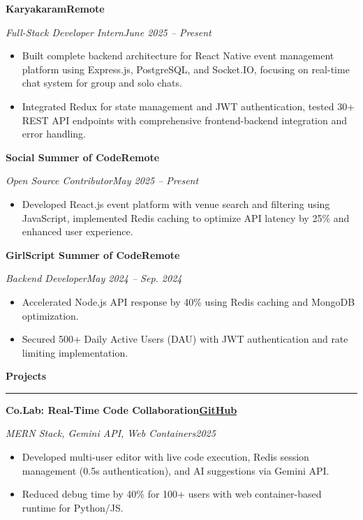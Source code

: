 \documentclass{article}
\newcommand{\sectionheader}[1]{%
  \vspace{1.5ex}\noindent\textbf{\Large #1}%
  \par\rule{\textwidth}{0.8pt}\vspace{0.5ex}%
}
\newcommand{\subheading}[4]{%
  \vspace{0.5ex}\noindent\textbf{#1}\hfill\textbf{#2}\par%
  \noindent\textit{#3}\hfill\textit{#4}\par\vspace{-0.5ex}%
}
\begin{document}
\subheading{Karyakaram}{Remote}
            {Full-Stack Developer Intern}{June 2025 – Present}
\begin{itemize}[leftmargin=*,noitemsep,topsep=0pt,parsep=0pt,partopsep=0pt]
    \item Built complete backend architecture for React Native event management platform using Express.js, PostgreSQL, and Socket.IO, focusing on real-time chat system for group and solo chats.
    \item Integrated Redux for state management and JWT authentication, tested 30+ REST API endpoints with comprehensive frontend-backend integration and error handling.
\end{itemize}

\subheading{Social Summer of Code}{Remote}
            {Open Source Contributor}{May 2025 – Present}
\begin{itemize}[leftmargin=*,noitemsep,topsep=0pt,parsep=0pt,partopsep=0pt]
    \item Developed React.js event platform with venue search and filtering using JavaScript, implemented Redis caching to optimize API latency by 25\% and enhanced user experience.
\end{itemize}

\subheading{GirlScript Summer of Code}{Remote}
            {Backend Developer}{May 2024 – Sep. 2024}
\begin{itemize}[leftmargin=*,noitemsep,topsep=0pt,parsep=0pt,partopsep=0pt]
    \item Accelerated Node.js API response by 40\% using Redis caching and MongoDB optimization.
    \item Secured 500+ Daily Active Users (DAU) with JWT authentication and rate limiting implementation.
\end{itemize}

\sectionheader{Projects}
\subheading{Co.Lab: Real-Time Code Collaboration}{\href{https://github.com/Harsh0369/Co.Lab}{GitHub}}
            {MERN Stack, Gemini API, Web Containers}{2025}
\begin{itemize}[leftmargin=*,noitemsep,topsep=0pt,parsep=0pt,partopsep=0pt]
    \item Developed multi-user editor with live code execution, Redis session management (0.5s authentication), and AI suggestions via Gemini API.
    \item Reduced debug time by 40\% for 100+ users with web container-based runtime for Python/JS.
\end{itemize}
\end{document}
